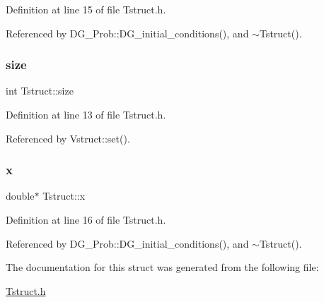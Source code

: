 Definition at line 15 of file Tstruct.\+h.



Referenced by D\+G\+\_\+\+Prob\+::\+D\+G\+\_\+initial\+\_\+conditions(), and $\sim$\+Tstruct().

\mbox{\label{structTstruct_af22c0d91803bee735b321f3c5bf7b1c7}} 
\subsubsection{\texorpdfstring{size}{size}}
{\footnotesize\ttfamily int Tstruct\+::size}



Definition at line 13 of file Tstruct.\+h.



Referenced by Vstruct\+::set().

\mbox{\label{structTstruct_a1f9679d8553f8f0be6b1ea1e7c3ade80}} 
\subsubsection{\texorpdfstring{x}{x}}
{\footnotesize\ttfamily double$\ast$ Tstruct\+::x}



Definition at line 16 of file Tstruct.\+h.



Referenced by D\+G\+\_\+\+Prob\+::\+D\+G\+\_\+initial\+\_\+conditions(), and $\sim$\+Tstruct().



The documentation for this struct was generated from the following file\+:\begin{DoxyCompactItemize}
\item 
\hyperlink{Tstruct_8h}{Tstruct.\+h}\end{DoxyCompactItemize}
